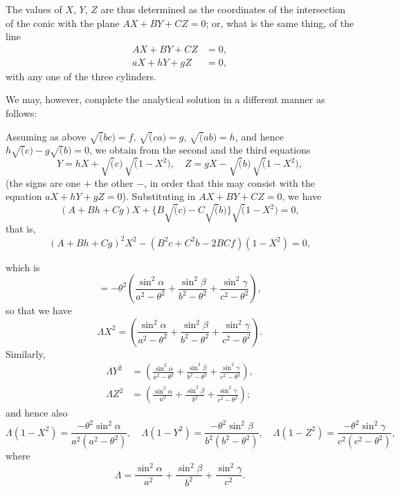 \documentclass[11pt,a4paper]{article}
\theoremstyle{plain}
\theoremstyle{definition}
\theoremstyle{remark}
\begin{document}
The values of $X$, $Y$, $Z$ are thus determined as the coordinates of the intersection of the conic with the plane $AX + BY + CZ = 0$; or, what is the same thing, of the line
\begin{align*}
AX + BY + CZ &= 0,\\
aX + hY + gZ &= 0,
\end{align*}
with any one of the three cylinders.

We may, however, complete the analytical solution in a different manner as follows:

Assuming as above $\surd(bc) = f$, $\surd(ca) = g$, $\surd(ab) = h$, and hence $h\surd(c) - g\surd(b) = 0$, we obtain from the second and the third equations
\[
Y = hX + \surd(c)\,\surd(1-X^2),\quad Z = gX - \surd(b)\,\surd(1-X^2),
\]
(the signs are one $+$ the other $-$, in order that this may consist with the equation $aX + hY + gZ = 0$). Substituting in $AX + BY + CZ = 0$, we have
\[
(A + Bh + Cg)X + \{B\surd(c) - C\surd(b)\}\surd(1-X^2) = 0,
\]
that is,
\[
(A + Bh + Cg)^2 X^2 - (B^2c + C^2b - 2BCf)(1-X^2) = 0,
\]

which is
\[
= -\theta^2\left(\frac{\sin^2\alpha}{a^2-\theta^2} + \frac{\sin^2\beta}{b^2-\theta^2} + \frac{\sin^2\gamma}{c^2-\theta^2}\right),
\]
so that we have
\[
\Lambda X^2 = \left(\frac{\sin^2\alpha}{a^2-\theta^2} + \frac{\sin^2\beta}{b^2-\theta^2} + \frac{\sin^2\gamma}{c^2-\theta^2}\right).
\]
Similarly,
\begin{align*}
\Lambda Y^2 &= \left(\frac{\sin^2\alpha}{a^2-\theta^2} + \frac{\sin^2\beta}{b^2-\theta^2} + \frac{\sin^2\gamma}{c^2-\theta^2}\right),\\
\Lambda Z^2 &= \left(\frac{\sin^2\alpha}{a^2} + \frac{\sin^2\beta}{b^2} + \frac{\sin^2\gamma}{c^2-\theta^2}\right);
\end{align*}
and hence also
\[
\Lambda(1-X^2) = \frac{-\theta^2\sin^2\alpha}{a^2(a^2-\theta^2)},\quad \Lambda(1-Y^2) = \frac{-\theta^2\sin^2\beta}{b^2(b^2-\theta^2)},\quad \Lambda(1-Z^2) = \frac{-\theta^2\sin^2\gamma}{c^2(c^2-\theta^2)},
\]
where
\[
\Lambda = \frac{\sin^2\alpha}{a^2} + \frac{\sin^2\beta}{b^2} + \frac{\sin^2\gamma}{c^2}.
\]
\end{document}
